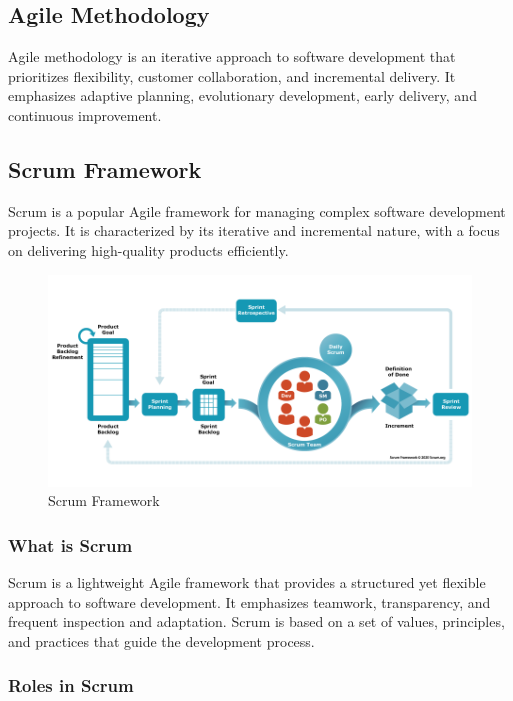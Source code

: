 \subsection{Agile Methodology}

Agile methodology is an iterative approach to software development that
prioritizes flexibility, customer collaboration, and incremental delivery. It
emphasizes adaptive planning, evolutionary development, early delivery, and
continuous improvement.

\subsection{Scrum Framework}

Scrum is a popular Agile framework for managing complex software development
projects. It is characterized by its iterative and incremental nature, with a
focus on delivering high-quality products efficiently.

\begin{figure}
      \centering
      \includegraphics[width=1\textwidth]{../images/scrum.png}
      \caption{Scrum Framework}
      \label{fig:Scrum Framework}
\end{figure}

\subsubsection{What is Scrum}

Scrum is a lightweight Agile framework that provides a structured yet flexible
approach to software development. It emphasizes teamwork, transparency, and
frequent inspection and adaptation. Scrum is based on a set of values,
principles, and practices that guide the development process.

\subsubsection{Roles in Scrum}


